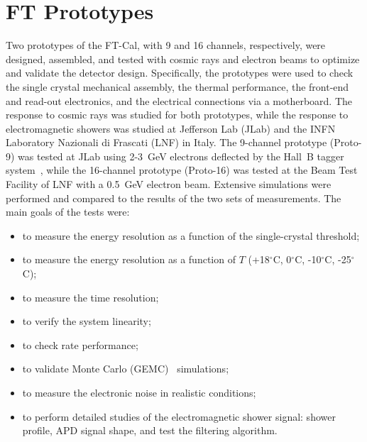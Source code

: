 \section{FT Prototypes}

Two prototypes of the FT-Cal, with 9 and 16 channels, respectively, were designed, assembled, and tested with
cosmic rays and electron beams to optimize and validate the detector design. Specifically, the prototypes were
used to check the single crystal mechanical assembly, the thermal performance, the front-end and read-out
electronics, and the electrical connections via a motherboard. The response to cosmic rays was studied for both
prototypes, while the response to electromagnetic showers was studied at Jefferson Lab (JLab) and the INFN
Laboratory Nazionali di Frascati (LNF) in Italy. The 9-channel prototype (Proto-9) was tested at JLab using 2-3~GeV
electrons deflected by the Hall~B tagger system~\cite{beamline},  while the 16-channel prototype (Proto-16) was
tested at the Beam Test Facility of LNF with a 0.5~GeV electron beam. Extensive simulations were performed
and compared to the results of the two sets of measurements. The main goals of the tests were:

\begin{itemize}
\item to measure the energy resolution as a function of the single-crystal threshold;
\item to measure the energy resolution as a function of $T$ (+18$^\circ$C, 0$^\circ$C, -10$^\circ$C, -25$^\circ$C);
\item to measure the time resolution;
\item to verify the system linearity;
\item to check rate performance;
\item to validate Monte Carlo (GEMC)~\cite{gemc} simulations;
\item to measure the electronic noise in realistic conditions;
\item to perform detailed studies of the electromagnetic shower signal: shower profile, APD signal shape, and test
  the filtering algorithm.
\end{itemize}

